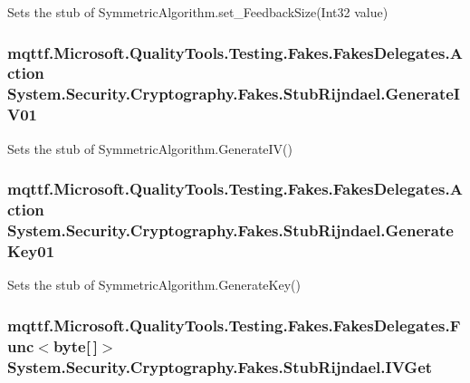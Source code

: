 Sets the stub of Symmetric\-Algorithm.\-set\-\_\-\-Feedback\-Size(\-Int32 value)

\hypertarget{class_system_1_1_security_1_1_cryptography_1_1_fakes_1_1_stub_rijndael_a4f66be67293960b4664854656761c70c}{
\subsubsection[{Generate\-I\-V01}]{\setlength{\rightskip}{0pt plus 5cm}mqttf.\-Microsoft.\-Quality\-Tools.\-Testing.\-Fakes.\-Fakes\-Delegates.\-Action System.\-Security.\-Cryptography.\-Fakes.\-Stub\-Rijndael.\-Generate\-I\-V01}}\label{class_system_1_1_security_1_1_cryptography_1_1_fakes_1_1_stub_rijndael_a4f66be67293960b4664854656761c70c}


Sets the stub of Symmetric\-Algorithm.\-Generate\-I\-V()

\hypertarget{class_system_1_1_security_1_1_cryptography_1_1_fakes_1_1_stub_rijndael_a47b54f596b9a7c8804734188dfd68016}{
\subsubsection[{Generate\-Key01}]{\setlength{\rightskip}{0pt plus 5cm}mqttf.\-Microsoft.\-Quality\-Tools.\-Testing.\-Fakes.\-Fakes\-Delegates.\-Action System.\-Security.\-Cryptography.\-Fakes.\-Stub\-Rijndael.\-Generate\-Key01}}\label{class_system_1_1_security_1_1_cryptography_1_1_fakes_1_1_stub_rijndael_a47b54f596b9a7c8804734188dfd68016}


Sets the stub of Symmetric\-Algorithm.\-Generate\-Key()

\hypertarget{class_system_1_1_security_1_1_cryptography_1_1_fakes_1_1_stub_rijndael_a0c3fa652ea322dd81930fc531b0cf59d}{
\subsubsection[{I\-V\-Get}]{\setlength{\rightskip}{0pt plus 5cm}mqttf.\-Microsoft.\-Quality\-Tools.\-Testing.\-Fakes.\-Fakes\-Delegates.\-Func$<$byte\mbox{[}$\,$\mbox{]}$>$ System.\-Security.\-Cryptography.\-Fakes.\-Stub\-Rijndael.\-I\-V\-Get}}\label{class_system_1_1_security_1_1_cryptography_1_1_fakes_1_1_stub_rijndael_a0c3fa652ea322dd81930fc531b0cf59d}


